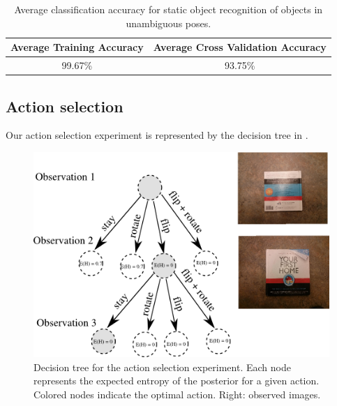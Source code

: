         \begin{table}[h]
                \centering
                \begin{tabular}{|c|c|}
                \hline
                Average Training Accuracy & Average Cross Validation Accuracy \\
                \hline
                99.67\% & 93.75\% \\
                \hline
                \end{tabular}
                \caption{Average classification accuracy for static object recognition of objects in unambiguous poses.}
                \label{tab:accuracy}
        \end{table}

    \subsection{Action selection}

        Our action selection experiment is represented by the decision tree in .

        \begin{figure}[h]
            \centering
            \includegraphics[scale=0.7]{pics/tree_small2.png}
            \caption{Decision tree for the action selection experiment. Each node represents the expected entropy of the posterior for a given action. Colored nodes indicate the optimal action. Right: observed images.}
            \label{fig:tree} %
        \end{figure}

